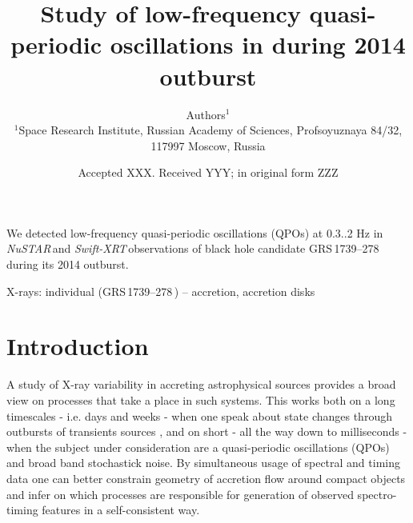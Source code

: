 \documentclass[a4paper,fleqn,usenatbib]{mnras}
\title[Study of low-frequency QPO in \grs]{Study of low-frequency quasi-periodic oscillations in \grs during 2014 outburst}
\author[Authors]{
Authors$^{1}$
\\
$^{1}$Space Research Institute, Russian Academy of Sciences, Profsoyuznaya 84/32, 117997 Moscow, Russia\\
}
\date{Accepted XXX. Received YYY; in original form ZZZ}
\def\grs{{GRS\,1739--278\,}}
\def\swiftx{{\em Swift-XRT\,}}
\def\nustar{{\em NuSTAR\,}}
\begin{document}
\label{firstpage}
\pagerange{\pageref{firstpage}--\pageref{lastpage}}
\maketitle

\begin{abstract}
\end{abstract}
We detected low-frequency quasi-periodic oscillations (QPOs) at 0.3..2 Hz in \nustar and \swiftx observations of black hole candidate \grs during its 2014 outburst.

\begin{keywords}
X-rays: individual (\grs)  -- accretion, accretion disks	
\end{keywords}


\section{Introduction}
\label{sec:intro} 
A study of X-ray variability in accreting astrophysical sources provides a broad view on processes that take a place in such systems. This works both on a long timescales - i.e. days and weeks - when one speak about state changes through outbursts of transients sources  \citep[see e.g.][]{2005Ap&SS.300..107H, heil15}, and on short - all the way down to milliseconds - when the subject under consideration are a quasi-periodic oscillations (QPOs) and broad band stochastick noise. By simultaneous usage of spectral and timing data one can better constrain geometry of accretion flow around compact objects and infer on which processes are responsible for generation of observed spectro-timing features in a self-consistent way.
\end{document}
